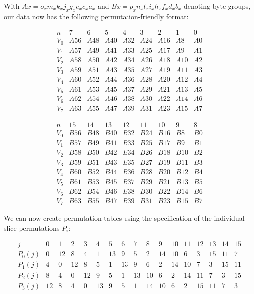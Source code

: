 \documentclass[12pt]{report}
\begin{document}
With $Ax=o_xm_xk_xj_xg_xe_xc_xa_x$ and $Bx=p_xn_xl_xi_xh_xf_xd_xb_x$ denoting
byte groups, our data now has the following permutation-friendly format:

\[
    \begin{array}{c|llllllll}
        n & 7 & 6 & 5 & 4 & 3 & 2 & 1 & 0 \\
        \hline
        V_0 & A56 & A48 & A40 & A32 & A24 & A16 & A8 & A0 \\
        V_1 & A57 & A49 & A41 & A33 & A25 & A17 & A9 & A1 \\
        V_2 & A58 & A50 & A42 & A34 & A26 & A18 & A10 & A2 \\
        V_3 & A59 & A51 & A43 & A35 & A27 & A19 & A11 & A3 \\
        V_4 & A60 & A52 & A44 & A36 & A28 & A20 & A12 & A4 \\
        V_5 & A61 & A53 & A45 & A37 & A29 & A21 & A13 & A5 \\
        V_6 & A62 & A54 & A46 & A38 & A30 & A22 & A14 & A6 \\
        V_7 & A63 & A55 & A47 & A39 & A31 & A23 & A15 & A7
    \end{array}
\]

\[
    \begin{array}{c|llllllll}
        n & 15 & 14 & 13 & 12 & 11 & 10 & 9 & 8 \\
        \hline
        V_0 & B56 & B48 & B40 & B32 & B24 & B16 & B8 & B0 \\
        V_1 & B57 & B49 & B41 & B33 & B25 & B17 & B9 & B1 \\
        V_2 & B58 & B50 & B42 & B34 & B26 & B18 & B10 & B2 \\
        V_3 & B59 & B51 & B43 & B35 & B27 & B19 & B11 & B3 \\
        V_4 & B60 & B52 & B44 & B36 & B28 & B20 & B12 & B4 \\
        V_5 & B61 & B53 & B45 & B37 & B29 & B21 & B13 & B5 \\
        V_6 & B62 & B54 & B46 & B38 & B30 & B22 & B14 & B6 \\
        V_7 & B63 & B55 & B47 & B39 & B31 & B23 & B15 & B7
    \end{array}
\]

We can now create permutation tables using the specification of the individual
slice permutations $P_i$:

\[
    \begin{array}{c|llllllllllllllll}
        j & 0 & 1 & 2 & 3 & 4 & 5 & 6 & 7 & 8 & 9 & 10 & 11 & 12 & 13 & 14 & 15 \\
        \hline
        P_0(j) & 0 & 12 & 8 & 4 & 1 & 13 & 9 & 5 & 2 & 14 & 10 & 6 & 3 & 15 & 11 & 7 \\
        P_1(j) & 4 & 0 & 12 & 8 & 5 & 1 & 13 & 9 & 6 & 2 & 14 & 10 & 7 & 3 & 15 & 11 \\
        P_2(j) & 8 & 4 & 0 & 12 & 9 & 5 & 1 & 13 & 10 & 6 & 2 & 14 & 11 & 7 & 3 & 15 \\
        P_3(j) & 12 & 8 & 4 & 0 & 13 & 9 & 5 & 1 & 14 & 10 & 6 & 2 & 15 & 11 & 7 & 3
    \end{array}
\]
\end{document}
